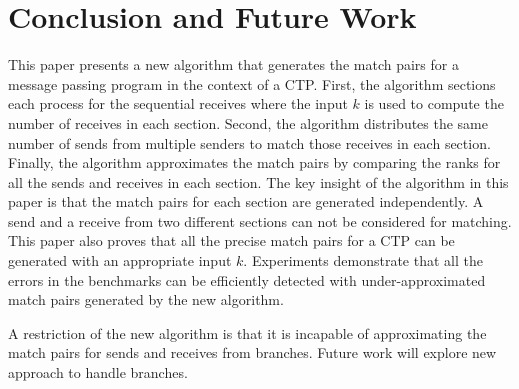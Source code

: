 \section{Conclusion and Future Work}
This paper presents a new algorithm that generates the match pairs for a message passing program in the context of a CTP.
First, the algorithm sections each process for the sequential receives where the input $k$ is used to compute the number of receives in each section.
Second, the algorithm distributes the same number of sends from multiple senders to match those receives in each section. Finally, the algorithm approximates the match pairs by comparing the ranks for all the sends and receives in each section. The key insight of the algorithm in this paper is that the match pairs for each section are generated independently. 
A send and a receive from two different sections can not be considered for matching. 
This paper also proves that all the precise match pairs for a CTP can be generated with an appropriate input $k$. Experiments demonstrate that all the errors in the benchmarks can be efficiently detected with under-approximated match pairs generated by the new algorithm. 

A restriction of the new algorithm is that it is incapable of approximating the match pairs for sends and receives from branches. Future work will explore new approach to handle branches.


